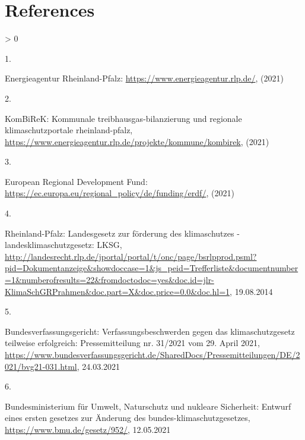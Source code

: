 \documentclass[a4paper,11pt]{article}
\newlength{\cslhangindent}
\newlength{\csllabelwidth}
\newenvironment{CSLReferences}[3] %
 {%
  \setlength{\parindent}{0pt}
  \ifodd #1 \everypar{\setlength{\hangindent}{\cslhangindent}}\ignorespaces\fi
  \ifnum #2 > 0
  \setlength{\parskip}{#2\baselineskip}
  \fi
 }%
 {}
\newcommand{\CSLLeftMargin}[1]{\parbox[t]{\maxof{\widthof{#1}}{\csllabelwidth}}{#1}}
\newcommand{\CSLRightInline}[1]{\parbox[t]{\linewidth}{#1}}
\begin{document}
\hypertarget{references}{%
\section*{References}\label{references}}

\noindent

\setlength{\parindent}{-0.5cm}
\setlength{\leftskip}{0.5cm}
\setlength{\parskip}{8pt}

\hypertarget{refs}{}
\begin{CSLReferences}{0}{0}
\leavevmode\hypertarget{ref-EnergieagenturRheinlandPfalz.2021}{}%
\CSLLeftMargin{1. }
\CSLRightInline{Energieagentur Rheinland-Pfalz: \url{https://www.energieagentur.rlp.de/}, (2021)}

\leavevmode\hypertarget{ref-KomBiReK.2021}{}%
\CSLLeftMargin{2. }
\CSLRightInline{KomBiReK: Kommunale treibhausgas-bilanzierung und regionale klimaschutzportale rheinland-pfalz, \url{https://www.energieagentur.rlp.de/projekte/kommune/kombirek}, (2021)}

\leavevmode\hypertarget{ref-EuropeanRegionalDevelopmentFund.2021}{}%
\CSLLeftMargin{3. }
\CSLRightInline{European Regional Development Fund: \url{https://ec.europa.eu/regional_policy/de/funding/erdf/}, (2021)}

\leavevmode\hypertarget{ref-RheinlandPfalz.19.08.2014}{}%
\CSLLeftMargin{4. }
\CSLRightInline{Rheinland-Pfalz: Landesgesetz zur f{ö}rderung des klimaschutzes - landesklimaschutzgesetz: LKSG, \url{http://landesrecht.rlp.de/jportal/portal/t/onc/page/bsrlpprod.psml?pid=Dokumentanzeige\&showdoccase=1\&js_peid=Trefferliste\&documentnumber=1\&numberofresults=22\&fromdoctodoc=yes\&doc.id=jlr-KlimaSchGRPrahmen\&doc.part=X\&doc.price=0.0\&doc.hl=1}, 19.08.2014}

\leavevmode\hypertarget{ref-Bundesverfassungsgericht.24.03.2021}{}%
\CSLLeftMargin{5. }
\CSLRightInline{Bundesverfassungsgericht: Verfassungsbeschwerden gegen das klimaschutzgesetz teilweise erfolgreich: Pressemitteilung nr. 31/2021 vom 29. April 2021, \url{https://www.bundesverfassungsgericht.de/SharedDocs/Pressemitteilungen/DE/2021/bvg21-031.html}, 24.03.2021}

\leavevmode\hypertarget{ref-BundesministeriumfurUmweltNaturschutzundnukleareSicherheit.12.05.2021}{}%
\CSLLeftMargin{6. }
\CSLRightInline{Bundesministerium für Umwelt, Naturschutz und nukleare Sicherheit: Entwurf eines ersten gesetzes zur {Ä}nderung des bundes-klimaschutzgesetzes, \url{https://www.bmu.de/gesetz/952/}, 12.05.2021}


\end{CSLReferences}
\end{document}
